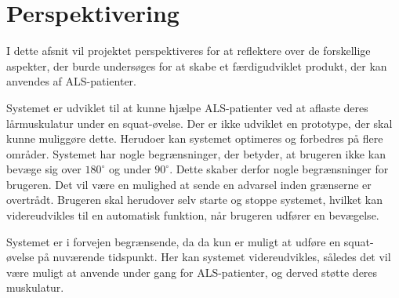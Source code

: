 \section{Perspektivering}
I dette afsnit vil projektet perspektiveres for at reflektere over de forskellige aspekter, der burde undersøges for at skabe et færdigudviklet produkt, der kan anvendes af ALS-patienter. 

Systemet er udviklet til at kunne hjælpe ALS-patienter ved at aflaste deres lårmuskulatur under en squat-øvelse. Der er ikke udviklet en prototype, der skal kunne muliggøre dette. Herudoer kan systemet optimeres og forbedres på flere områder. Systemet har nogle begrænsninger, der betyder, at brugeren ikke kan bevæge sig over $180^{\circ}$ og under $90^{\circ}$. Dette skaber derfor nogle begrænsninger for brugeren. Det vil være en mulighed at sende en advarsel inden grænserne er overtrådt. Brugeren skal herudover selv starte og stoppe systemet, hvilket kan videreudvikles til en automatisk funktion, når brugeren udfører en bevægelse. 


Systemet er i forvejen begrænsende, da da kun er muligt at udføre en squat-øvelse på nuværende tidspunkt. Her kan systemet videreudvikles, således det vil være muligt at anvende under gang for ALS-patienter, og derved støtte deres muskulatur. 

